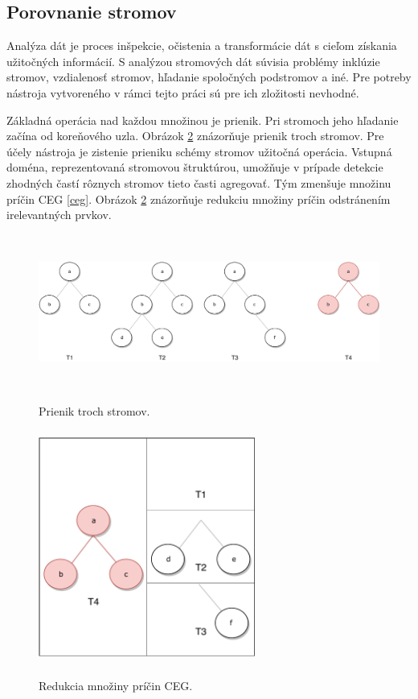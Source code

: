 \subsection*{Porovnanie stromov}
Analýza dát je proces inšpekcie, očistenia a transformácie dát s cieľom získania užitočných informácií. S analýzou stromových dát súvisia problémy inklúzie stromov, vzdialenosť stromov, hľadanie spoločných podstromov a iné. Pre potreby nástroja vytvoreného v rámci tejto práci sú pre ich zložitosti nevhodné.

Základná operácia nad každou množinou je prienik. Pri stromoch jeho hľadanie začína od koreňového uzla. Obrázok \ref{intersection_img} znázorňuje prienik troch stromov. Pre účely nástroja je zistenie prieniku schémy stromov užitočná operácia. Vstupná doména, reprezentovaná stromovou štruktúrou, umožňuje v prípade detekcie zhodných častí rôznych stromov tieto časti agregovať. Tým zmenšuje množinu príčin CEG \ref{ceg}. Obrázok \ref{intersection_img} znázorňuje redukciu množiny príčin odstránením irelevantných prvkov.
\begin{figure}[h]\centering
	\centering
	\includegraphics[width=6.0in,height=2.0in]{obrazky-figures/tree_intersection.pdf}\\[1pt]
	\caption{Prienik troch stromov.}
	\label{intersection_img}
\end{figure} 
\begin{figure}[h]\centering
	\centering
	\includegraphics[width=2.8in,height=3.0in]{obrazky-figures/cause_intersection.pdf}\\[1pt]
	\caption{Redukcia množiny príčin CEG.}
	\label{intersection_img}
\end{figure} 

